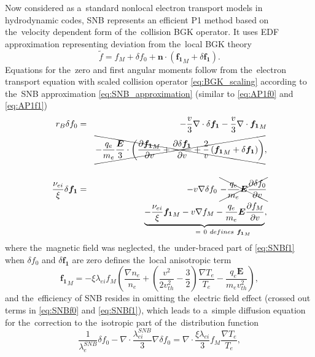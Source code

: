 \documentclass[
 aps,
 jmp,
 amsmath,amssymb,
 twocolumn,
]{revtex4-1}
\newcommand{\pdv}[2]{\frac{\partial{#1}}{\partial{#2}}}
\newcommand{\vect}[1]{\boldsymbol{#1}}
\newcommand{\mfpe}{\lambda_e}
\newcommand{\mfpei}{\lambda_{ei}}
\newcommand{\nuei}{\nu_{ei}}
\newcommand{\vmag}{v}
\newcommand{\vth}{v_{th}}
\newcommand{\vn}{\vect{n}}
\newcommand{\E}{\vect{E}}
\newcommand{\B}{\vect{B}}
\newcommand{\omegaB}{\vect{\omega}_{B}}
\newcommand{\qe}{q_e}
\newcommand{\me}{m_e}
\newcommand{\Te}{T_e}
\newcommand{\ed}{n_e}
\newcommand{\fM}{f_M}
\newcommand{\fzero}{f_0}
\newcommand{\fone}{{\vect{f_1}}}
\newcommand{\ft}{f}
\begin{document}
Now considered as a~standard nonlocal electron transport models in hydrodynamic 
codes, SNB \cite{Schurtz_2000} represents an efficient P1 method based on
the~velocity dependent form of the~collision BGK operator. It uses EDF 
approximation representing deviation from the~local BGK theory
\begin{equation}
  \tilde{\ft} = 
  \fM + \delta\fzero 
  + \vn\cdot\left(\fone_M + \delta\fone\right) . 
  \label{eq:SNB_approximation}
\end{equation}
Equations for the~zero and first angular moments follow from 
the~electron transport equation with scaled collision operator 
\eqref{eq:BGK_scaling}
according to the~SNB approximation \eqref{eq:SNB_approximation} 
(similar to \eqref{eq:AP1f0} and \eqref{eq:AP1f1})
\begin{eqnarray}
  r_B \delta\fzero &=&
  - \frac{\vmag}{3}\nabla\cdot\delta\fone
  - \frac{\vmag}{3}\nabla\cdot\fone_M
  \nonumber\\ 
  &&\xcancel{- \frac{\qe}{\me}\frac{\E}{3}\cdot\left(
  \pdv{\fone_M}{\vmag} + \pdv{\delta\fone}{\vmag} 
  + \frac{2}{\vmag}\left(\fone_M + \delta\fone\right)\right)} , 
  \nonumber \\
  \label{eq:SNBf0}\\
  \frac{\nuei}{\xi}\delta\fone &=& - \vmag\nabla\delta\fzero 
  ~\xcancel{- \frac{\qe}{\me}\E\pdv{\delta\fzero}{\vmag}}
  \nonumber \\
  &&\underbrace{- \frac{\nuei}{\xi}\fone_M - \vmag\nabla\fM
  - \frac{\qe}{\me}\E\pdv{\fM}{\vmag}
  }_{~~~~~~~~~~~~~=~0~defines~\fone_M} 
  ,
  \nonumber \\
  \label{eq:SNBf1}
\end{eqnarray}
where the~magnetic field was neglected, the~under-braced part
of \eqref{eq:SNBf1} when $\delta\fzero$ and $\delta \fone$ are zero
defines the~local anisotropic term
\begin{equation}
  \fone_M = -\xi\mfpei\fM\left( \frac{\nabla\ed}{\ed} 
+ \left( \frac{\vmag^2}{2\vth^2} - \frac{3}{2}\right)
\frac{\nabla\Te}{\Te} - \frac{\qe\E}{\me\vth^2}\right) ,
  \label{eq:f1M}
\end{equation}
and the~efficiency of SNB resides in omitting the~electric field 
effect (crossed out terms in \eqref{eq:SNBf0} and \eqref{eq:SNBf1}), which
leads to a~simple diffusion equation for the~correction to the~isotropic 
part of the~distribution function
\begin{equation}
  \frac{1}{\mfpe^{SNB}}\delta\fzero 
  - \nabla\cdot\frac{\mfpei^{SNB}}{3}\nabla\delta\fzero =
  \nabla\cdot\frac{\xi\mfpei}{3}\fM\frac{\nabla \Te}{\Te}
  ,
  \label{eq:SNB_model}
\end{equation}
\end{document}
